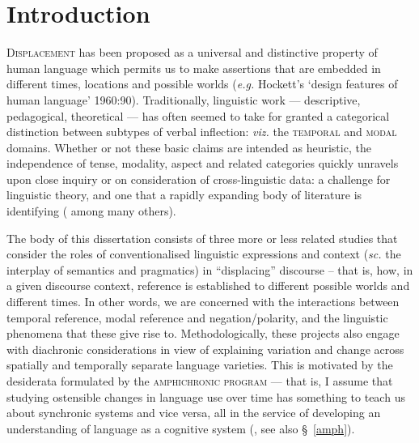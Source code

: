 \documentclass[12pt,dvipsnames]{report}
\begin{document}
\setcounter{tocdepth}{3}\tableofcontents	\gathertags

\setcounter{chapter}{0}
\setcounter{part}{0}
\reversemarginpar%


\chapter{Introduction}%
%
\label{IntroCh}
\lettrine{D}{isplacement} has been proposed as a universal and distinctive property of human language which permits us to make assertions that are embedded in different times, locations and possible worlds (\textit{e.g.} Hockett's `design features of human language' 1960:90). Traditionally, linguistic work --- descriptive, pedagogical, theoretical --- has often seemed to take for granted a categorical distinction between subtypes of verbal inflection: \textit{viz.} the \textsc{temporal} and \textsc{modal} domains. Whether or not these basic claims are intended as heuristic, the independence of tense, modality, aspect and related categories quickly unravels upon close inquiry or on consideration of cross-linguistic data: a challenge for linguistic theory, and one that a rapidly expanding body of literature is identifying  (\citealp[\textit{e.g.},][]{Condoravdi2002,Laca2012,Hacquard2006,Rullmann2018} among many others).


The body of this dissertation consists of three more or less related studies that consider the roles of conventionalised linguistic expressions and context (\textit{sc.} the interplay of semantics and pragmatics) in ``displacing'' discourse -- that is, how, in a given discourse context, reference is established to different possible worlds and different times. In other words, we are concerned with the interactions between temporal reference, modal reference and negation/polarity, and the linguistic phenomena that these give rise to. Methodologically, these projects also engage with diachronic considerations in view of explaining variation and change across spatially and temporally separate language varieties. This is motivated by the desiderata formulated by the \textsc{amphichronic program} --- that is, I assume that studying ostensible changes in language use over time has something to teach us about synchronic systems and vice versa, all in the service of developing an understanding of language as a cognitive system (\citealp[\textit{e.g.},][]{Kiparsky2006,Deo2015,Anderson2016a}, see also \S~\ref{amph}).
\end{document}
